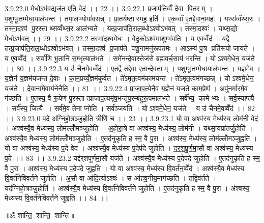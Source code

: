 3.9.22.0
मेधोऽभ॑व॒द्यज॑त एति॒ वेद॑ ।। 22 ।।
3.9.22.1
प्र॒जाप॑ति॒व्वैँ दे॒वा पि॒तरम् । प॒शुम्भू॒तम्मेधा॒याल॑भन्त । तमा॒लभ्योपा॑वसन्न् । प्रा॒तर्यष्टास्मह॒ इति॑ । एक॒व्वाँ ए॒तद्दे॒वाना॒महः॑ । यथ्स॑व्वँथ्स॒रः । तस्मा॒दश्व॑ पु॒रस्ताथ्सव्वँथ्स॒र आल॑भ्यते । यत्प्र॒जाप॑ति॒राल॒ब्धोऽश्वोऽभ॑वत् । तस्मा॒दश्वः॑ । यथ्स॒द्यो मेधोऽभ॑वत् ।। 79 ।।
3.9.22.2
तस्मा॑दश्वमे॒धः । वेदु॒कोऽश्व॑मा॒शुम्भ॑वति । य ए॒वव्वेँद॑ । यद्वै तत्प्र॒जाप॑ति॒राल॒ब्धोऽश्वोऽभ॑वत् । तस्मा॒दश्व॑ प्र॒जाप॑ते पशू॒नामनु॑रूपतमः । आऽस्य॑ पु॒त्र प्रति॑रूपो जायते । य ए॒वव्वेँद॑ । सर्वा॑णि भू॒तानि॑ स॒म्भृत्याल॑भते । समे॑नन्दे॒वास्तेज॑से ब्रह्मवर्च॒साय॑ भरन्ति । योऽश्वमे॒धेन॒ यज॑ते ।। 80 ।।
3.9.22.3
य उ॑ चैनमे॒वव्वेँद॑ । ए॒तद्वै तद्दे॒वा ए॒तान्दे॒वताम् । प॒शुम्भू॒तम्मेधा॒याल॑भन्त । य॒ज्ञमे॒व । य॒ज्ञेन॑ य॒ज्ञम॑यजन्त दे॒वाः । का॒म॒प्रय्यँ॒ज्ञम॑कुर्वत । ते॑ऽमृत॒त्वम॑कामयन्त । ते॑ऽमृत॒त्वम॑गच्छन्न् । योऽश्वमे॒धेन॒ यज॑ते । दे॒वाना॑मे॒वाय॑नेनैति ।। 81 ।।
3.9.22.4
प्रा॒जा॒प॒त्येनै॒व य॒ज्ञेन॑ यजते काम॒प्रेण॑ । अपु॑नर्मारमे॒व ग॑च्छति । ए॒तस्य॒ वै रू॒पेण॑ पु॒रस्तात्प्राजाप॒त्यमृ॑ष॒भन्तू॑प॒रम्ब॑हुरू॒पमाल॑भते । सर्वे॑भ्य॒ कामेभ्यः । सर्व॒स्याप्त्यै । सर्व॑स्य॒ जित्यै । सर्व॑मे॒व तेनाप्नोति । सर्व॑ञ्जयति । योऽश्वमे॒धेन॒ यज॑ते । य उ॑ चैनमे॒वव्वेँद॑ ।। 82 ।।
3.9.23.0
प॒दे अ॑ग्निहो॒त्रञ्जु॒होति॒ त्रीणि॑ च ।। 23 ।।
3.9.23.1
यो वा अश्व॑स्य॒ मेध्य॑स्य॒ लोम॑नी॒ वेद॑ । अश्व॑स्यै॒व मेध्य॑स्य॒ लोम॑ल्लोँमञ्जुहोति । अ॒हो॒रा॒त्रे वा अश्व॑स्य॒ मेध्य॑स्य॒ लोम॑नी । यथ्सा॒यंप्रा॑तर्जु॒होति॑ । अश्व॑स्यै॒व मेध्य॑स्य॒ लोम॑ल्लोँमञ्जुहोति । ए॒तद॑नुकृति ह स्म॒ वै पु॒रा । अश्व॑स्य॒ मेध्य॑स्य॒ लोम॑ल्लोँमञ्जुह्वति । यो वा अश्व॑स्य॒ मेध्य॑स्य प॒दे वेद॑ । अश्व॑स्यै॒व मेध्य॑स्य प॒देप॑दे जुहोति । द॒र्॒श॒पू॒र्ण॒मा॒सौ वा अश्व॑स्य॒ मेध्य॑स्य प॒दे ।। 83 ।।
3.9.23.2
यद्द॑र्‌शपूर्णमा॒सौ यज॑ते । अश्व॑स्यै॒व मेध्य॑स्य प॒देप॑दे जुहोति । ए॒तद॑नुकृति ह स्म॒ वै पु॒रा । अश्व॑स्य॒ मेध्य॑स्य प॒देप॑दे जुह्वति । यो वा अश्व॑स्य॒ मेध्य॑स्य वि॒वर्त॑न॒व्वेँद॑ । अश्व॑स्यै॒व मेध्य॑स्य वि॒वर्त॑नेविवर्तने जुहोति । अ॒सौ वा आ॑दि॒त्योऽश्वः॑ । स आ॑हव॒नीय॒माग॑च्छति । तद्विव॑र्तते । यद॑ग्निहो॒त्रञ्जु॒होति॑ । अश्व॑स्यै॒व मेध्य॑स्य वि॒वर्त॑नेविवर्तने जुहोति । ए॒तद॑नुकृति ह स्म॒ वै पु॒रा । अ॑श्वस्य॒ मेध्य॑स्य वि॒वर्त॑नेविवर्तने जुह्वति ।। 84 ।।

\centerline{॥ॐ शान्ति॒ शान्ति॒ शान्ति॑॥}
